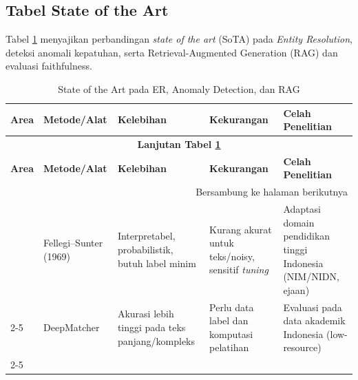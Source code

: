 \documentclass[12pt,a4paper,oneside]{report}
\begin{document}
    \begin{landscape}
        \section{Tabel State of the Art}

        Tabel \ref{tab:sota} menyajikan perbandingan \textit{state of the art} (SoTA) 
        pada \textit{Entity Resolution}, deteksi anomali kepatuhan, serta 
        Retrieval-Augmented Generation (RAG) dan evaluasi faithfulness.

        \small
        \setlength{\LTleft}{0pt}\setlength{\LTright}{0pt}
        \renewcommand{\arraystretch}{1.25}

        \begin{longtable}{|p{3.2cm}|p{4.2cm}|p{5.2cm}|p{5.2cm}|p{5.2cm}|}
        \caption{State of the Art pada ER, Anomaly Detection, dan RAG}
        \label{tab:sota}\\
        \hline
        \textbf{Area} & \textbf{Metode/Alat} & \textbf{Kelebihan} & \textbf{Kekurangan} & \textbf{Celah Penelitian} \\
        \hline
        \endfirsthead

        \multicolumn{5}{c}{{\bfseries Lanjutan Tabel \ref{tab:sota}}}\\
        \hline
        \textbf{Area} & \textbf{Metode/Alat} & \textbf{Kelebihan} & \textbf{Kekurangan} & \textbf{Celah Penelitian} \\
        \hline
        \endhead

        \hline \multicolumn{5}{r}{{Bersambung ke halaman berikutnya}} \\
        \endfoot

        \hline
        \endlastfoot

        \multirow{4}{*}{Entity Resolution}
        & Fellegi--Sunter (1969) \cite{fellegi1969record}
        & Interpretabel, probabilistik, butuh label minim
        & Kurang akurat untuk teks/noisy, sensitif \textit{tuning}
        & Adaptasi domain pendidikan tinggi Indonesia (NIM/NIDN, ejaan) \\ \cline{2-5}

        & DeepMatcher \cite{mudgal2018deepmatcher}
        & Akurasi lebih tinggi pada teks panjang/kompleks
        & Perlu data label dan komputasi pelatihan
        & Evaluasi pada data akademik Indonesia (low-resource) \\ \cline{2-5}


\end{longtable}
\end{landscape}
\end{document}
